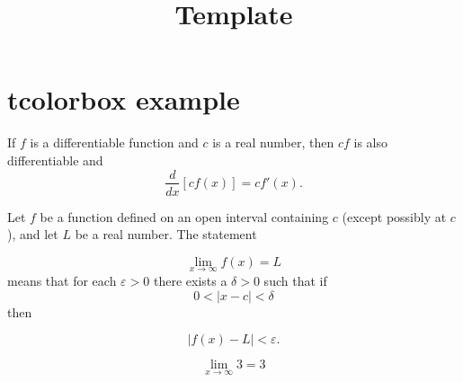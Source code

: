 



\title{Template}
\author{}
\date{}


\maketitle

\newpage

\section{tcolorbox example}

\begin{theorembox}[Theorem 2.4]

If \(f\) is a differentiable function and \(c\) is a real number, then \(cf\) is also differentiable and
\[
\frac{d}{dx}[cf(x)] = cf'(x).
\]

\end{theorembox}

\bigskip

\begin{definitionbox}
Let \(f\) be a function defined on an open interval containing \(c\) (except possibly at \(c\)), and let \(L\) be a real number. The statement

\[
\lim_{x \to \infty} f(x) = L
\]
means that for each \(\varepsilon > 0\) there exists a \(\delta > 0\) such that if
\[
0 < |x-c| < \delta
\]
then

\[
|f(x) - L| < \varepsilon.
\]

\end{definitionbox}

\bigskip


\begin{examplebox}
\[
\lim_{x \to \infty} 3 = 3
\]
\end{examplebox}


